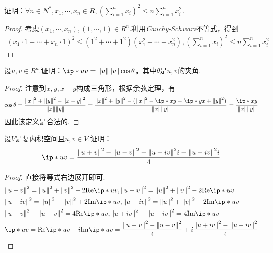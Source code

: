 \begin{problem}[12]\label{6.A.12}
    证明：\(\forall n \in N^*,x_1,\cdots,x_n \in R,(\sum_{i=1}^n x_i)^2 \leq n\sum_{i=1}^n x_i^2\).
\end{problem}

\begin{proof}
    考虑\((x_1,\cdots,x_n),(1,\cdots,1) \in R^n\).利用\textit{Cauchy-Schwarz}不等式，得到
    \begin{align*}
        (x_1 \cdot 1+\cdots+x_n \cdot 1)^2 \leq (1^2+\cdots+1^2)(x_1^2+\cdots+x_n^2),
        (\sum_{i=1}^n x_i)^2 \leq n\sum_{i=1}^n x_i^2
    \end{align*}
\end{proof}

\begin{problem}[14]\label{6.A.14}
    设\(u,v \in R^n\).证明：\(\ip*{u}{v}=\norm*{u}\norm*{v}\cos \theta\)，其中\(\theta\)是\(u,v\)的夹角.
\end{problem}

\begin{proof}
    注意到\(x,y,x-y\)构成三角形，根据余弦定理，有
    \begin{align*}
        \cos \theta =\dfrac{\norm*{x}^2+\norm*{y}^2-\norm*{x-y}^2}{\norm*{x}\norm*{y}}
        =\dfrac{\norm*{x}^2+\norm*{y}^2-(\norm*{x}^2-\ip*{x}{y}-\ip*{y}{x}+\norm*{y}^2)}{\norm*{x}\norm*{y}}
        =\dfrac{\ip*{x}{y}}{\norm*{x}\norm*{y}}
    \end{align*}
因此该定义是合法的.
\end{proof}

\newpage

\begin{problem}[20]\label{6.A.20}
    设\(V\)是复内积空间且\(u,v \in V\).证明：
    \begin{align*}
        \ip*{u}{v}=\dfrac{\norm*{u+v}^2-\norm*{u-v}^2+\norm*{u+iv}^2i-\norm*{u-iv}^2i}{4}
    \end{align*}
\end{problem}

\begin{proof}
    直接将等式右边展开即可.
    \begin{align*}
        &\norm*{u+v}^2=\norm*{u}^2+\norm*{v}^2+2\mathrm{Re}\ip*{u}{v},
        \norm*{u-v}^2=\norm*{u}^2+\norm*{v}^2-2\mathrm{Re}\ip*{u}{v} \\
        &\norm*{u+iv}^2=\norm*{u}^2+\norm*{v}^2+2\mathrm{Im}\ip*{u}{v},
        \norm*{u-iv}^2=\norm*{u}^2+\norm*{v}^2-2\mathrm{Im}\ip*{u}{v} \\
        &\norm*{u+v}^2-\norm*{u-v}^2=4\mathrm{Re}\ip*{u}{v},
        \norm*{u+iv}^2-\norm*{u-iv}^2=4\mathrm{Im}\ip*{u}{v} \\
        &\ip*{u}{v}=\mathrm{Re}\ip*{u}{v}+i\mathrm{Im}\ip*{u}{v}
        =\dfrac{\norm*{u+v}^2-\norm*{u-v}^2}{4}+i\dfrac{\norm*{u+iv}^2-\norm*{u-iv}^2}{4}
    \end{align*}
\end{proof}

